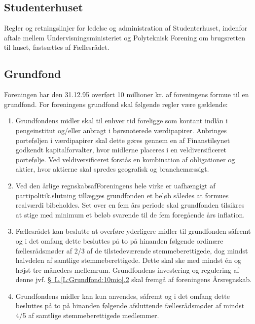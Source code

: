 \begin{list}
\subsection{Studenterhuset}
\item Regler og retningslinjer for ledelse og administration af Studenterhuset, indenfor aftale mellem Undervisningsministeriet og Polyteknisk Forening om brugsretten til huset, fastsættes af Fællesrådet.
\subsection{Grundfond}
\item \label{L:Grundfond:10mio} Foreningen har den 31.12.95 overført 10 millioner kr. af foreningens formue til en grundfond. For foreningens grundfond skal følgende regler være gældende:

\begin{enumerate}
\item Grundfondens midler skal til enhver tid foreligge som kontant indlån i pengeinstitut og/eller anbragt i børsnoterede værdipapirer. Anbringes porteføljen i værdipapirer skal dette gøres gennem en af Finanstilsynet godkendt kapitalforvalter, hvor midlerne placeres i en veldiversificeret portefølje. Ved veldiversificeret forstås en kombination af obligationer og aktier, hvor aktierne skal spredes geografisk og branchemæssigt.
\item Ved den årlige regnskabsafForeningens hele virke er uafhængigt af partipolitik.slutning tillægges grundfonden et beløb således at formues realværdi bibeholdes. Set over en fem års periode skal grundfonden tilsikres at stige med minimum et beløb svarende til de fem foregående års inflation.
\item Fællesrådet kan beslutte at overføre yderligere midler til grundfonden såfremt og i det omfang dette besluttes på to på hinanden følgende ordinære fællesrådsmøder af 2/3 af de tilstedeværende stemmeberettigede, dog mindst halvdelen af samtlige stemmeberettigede. Dette skal ske med mindst én og højst tre måneders mellemrum. Grundfondens investering og regulering af denne jvf. \hyperref[L:Grundfond:10mio]{\S \ L.\ref*{L:Grundfond:10mio}.2} skal fremgå af foreningens Årsregnskab.
\item Grundfondens midler kan kun anvendes, såfremt og i det omfang dette besluttes på to på hinanden følgende afsluttende fællesrådsmøder af mindst 4/5 af samtlige stemmeberettigede medlemmer.
\end{enumerate}


\end{list}
